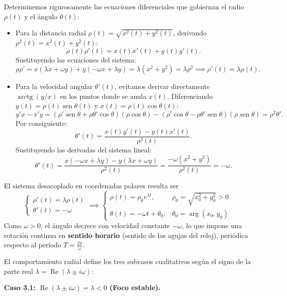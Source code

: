 Determinemos rigurosamente las ecuaciones diferenciales que gobiernan el radio $\rho(t)$ y el ángulo $\theta(t)$:
\begin{itemize}
    \item Para la distancia radial $\rho(t) = \sqrt{x^2(t) + y^2(t)}$, derivando $\rho^2(t) = x^2(t) + y^2(t)$:
    \[
        \rho(t) \rho'(t) = x(t) x'(t) + y(t) y'(t).
    \]
    Sustituyendo las ecuaciones del sistema:
    \[
        \rho \rho' = x (\lambda x + \omega y) + y (-\omega x + \lambda y) = \lambda (x^2 + y^2) = \lambda \rho^2 \implies \rho'(t) = \lambda \rho(t).
    \]
    \item Para la velocidad angular $\theta'(t)$, evitamos derivar directamente $\operatorname{arctg}(y/x)$ en los puntos donde se anula $x(t)$. Diferenciando $y(t) = \rho(t) \operatorname{sen} \theta(t)$ y $x(t) = \rho(t) \cos \theta(t)$:
    \[
        y' x - x' y = (\rho' \operatorname{sen} \theta + \rho \theta' \cos \theta)(\rho \cos \theta) - (\rho' \cos \theta - \rho \theta' \operatorname{sen} \theta)(\rho \operatorname{sen} \theta) = \rho^2 \theta'.
    \]
    Por consiguiente:
    \[
        \theta'(t) = \frac{x(t) y'(t) - y(t) x'(t)}{\rho^2(t)}.
    \]
    Sustituyendo las derivadas del sistema lineal:
    \[
        \theta'(t) = \frac{x(-\omega x + \lambda y) - y(\lambda x + \omega y)}{\rho^2(t)} = \frac{-\omega (x^2 + y^2)}{\rho^2(t)} = -\omega.
    \]
\end{itemize}
El sistema desacoplado en coordenadas polares resulta ser
\[
    \begin{cases}
        \rho'(t) = \lambda \rho(t) \\
        \theta'(t) = -\omega
    \end{cases}
    \implies
    \begin{cases}
        \rho(t) = \rho_0 e^{\lambda t}, & \rho_0 = \sqrt{x_0^2 + y_0^2} > 0 \\
        \theta(t) = -\omega t + \theta_0, & \theta_0 = \operatorname{arg}(x_0, y_0)
    \end{cases}
\]
Como $\omega > 0$, el ángulo decrece con velocidad constante $-\omega$, lo que impone una rotación continua en \textbf{sentido horario} (sentido de las agujas del reloj), periódica respecto al período $T = \frac{2\pi}{\omega}$.

El comportamiento radial define los tres subcasos cualitativos según el signo de la parte real $\lambda = \operatorname{Re}(\lambda \pm i \omega)$:

\textbf{Caso 3.1: $\operatorname{Re}(\lambda \pm i \omega) = \lambda < 0$ (Foco estable).}

